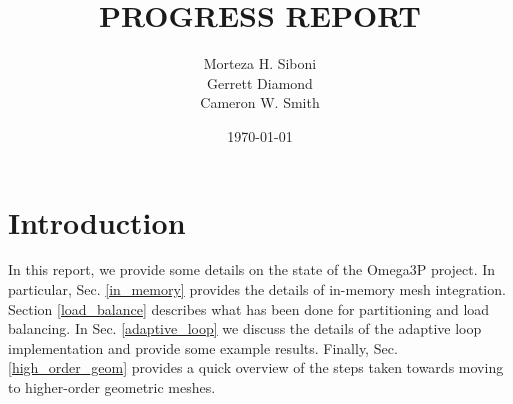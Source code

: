 \documentclass[review,12pt]{elsarticle_summary_report}
\begin{document}
\title{PROGRESS REPORT}%

\author[]{Morteza H. Siboni \\
Gerrett Diamond \\
Cameron W. Smith}



\date{\today}





\maketitle




\section{Introduction}
In this report, we provide some details on the state of the Omega3P project.
In particular, Sec. \ref{in_memory} provides the details of in-memory mesh integration.
Section \ref{load_balance} describes what has been done for partitioning and load balancing.
In Sec. \ref{adaptive_loop} we discuss the details of the adaptive loop implementation and provide some example results.
Finally, Sec. \ref{high_order_geom} provides a quick overview of the steps taken towards moving to higher-order geometric meshes.


\end{document}

